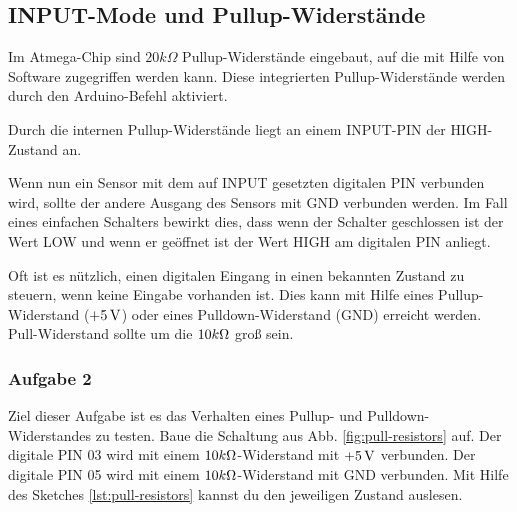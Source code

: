 \subsection{INPUT-Mode und Pullup-Widerstände } 

Im Atmega-Chip sind $20 k\Omega$ Pullup-Widerstände eingebaut, auf die mit Hilfe von Software zugegriffen werden kann. Diese integrierten Pullup-Widerstände werden durch den Arduino-Befehl  aktiviert. 

Durch die internen Pullup-Widerstände liegt an einem INPUT-PIN der HIGH-Zustand an. 



Wenn nun ein Sensor mit dem auf INPUT gesetzten digitalen PIN verbunden wird, sollte der andere Ausgang des Sensors mit GND verbunden werden. Im Fall eines einfachen Schalters bewirkt dies, dass wenn der Schalter geschlossen ist der Wert LOW und wenn er geöffnet ist der Wert HIGH am digitalen PIN anliegt.



Oft ist es nützlich, einen digitalen Eingang in einen bekannten Zustand zu steuern, wenn keine Eingabe vorhanden ist. Dies kann mit Hilfe eines Pullup-Widerstand ($+5\operatorname{V}$) oder eines Pulldown-Widerstand (GND) erreicht werden. Pull-Widerstand sollte um die $10k\Omega$ groß sein. 

\subsubsection{Aufgabe 2}

Ziel dieser Aufgabe ist es das Verhalten eines Pullup- und Pulldown-Widerstandes zu testen. Baue die Schaltung aus Abb. \ref{fig:pull-resistors} auf. Der digitale PIN 03 wird mit einem  $10k\Omega$-Widerstand mit $+5\operatorname{V}$ verbunden. Der digitale PIN 05 wird mit einem  $10k\Omega$-Widerstand mit GND verbunden. Mit Hilfe des Sketches \ref{lst:pull-resistors} kannst du den jeweiligen Zustand auslesen. 

